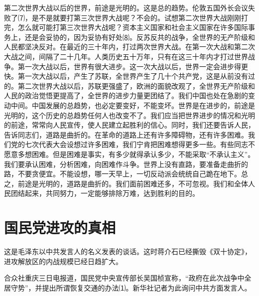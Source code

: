 \documentclass[UTF-8, a5paper, 12pt]{ctexart}
\begin{document}
第二次世界大战以后的世界，前途是光明的。这是总的趋势。伦敦五国外长会议失败了⑺，是不是就要打第三次世界大战呢？不会的。试想第二次世界大战刚刚打完，怎么就可能打第三次世界大战呢？资本主义国家和社会主义国家在许多国际事务上，还是会妥协的，因为妥协有好处⑻。反苏反共的战争，全世界的无产阶级和人民都坚决反对。在最近的三十年内，打过两次世界大战。在第一次大战和第二次大战之间，间隔了二十几年。人类历史五十万年，只有在这三十年内才打过世界战争。第一次大战以后，世界有很大进步。这一次大战以后，世界一定会进步得更快。第一次大战以后，产生了苏联，全世界产生了几十个共产党，这是从前没有过的。第二次世界大战以后，苏联更强盛了，欧洲的面貌改观了，全世界无产阶级和人民的政治觉悟更提高了，全世界的进步力量更团结了。我们中国也处在急剧的变动中间。中国发展的总趋势，也必定要变好，不能变坏。世界是在进步的，前途是光明的，这个历史的总趋势任何人也改变不了。我们应当把世界进步的情况和光明的前途，常常向人民宣传，使人民建立起胜利的信心。同时，我们还要告诉人民，告诉同志们，道路是曲折的。在革命的道路上还有许多障碍物，还有许多困难。我们党的七次代表大会设想过许多困难，我们宁肯把困难想得更多一些。有些同志不愿意多想困难。但是困难是事实，有多少就得承认多少，不能采取“不承认主义”。我们要承认困难，分析困难，向困难作斗争。世界上没有直路，要准备走曲折的路，不要贪便宜。不能设想，哪一天早上，一切反动派会统统自己跪在地下。总之，前途是光明的，道路是曲折的。我们面前困难还多，不可忽视。我们和全体人民团结起来，共同努力，一定能够排除万难，达到胜利的目的。

\section{国民党进攻的真相}

这是毛泽东以中共发言人的名义发表的谈话。这时蒋介石已经撕毁《双十协定》，进攻解放区的内战规模已经日趋扩大。

合众社重庆三日电报道，国民党中央宣传部长吴国桢宣称，“政府在此次战争中全居守势”，并提出所谓恢复交通的办法⑴。新华社记者为此询问中共方面发言人。
\end{document}
